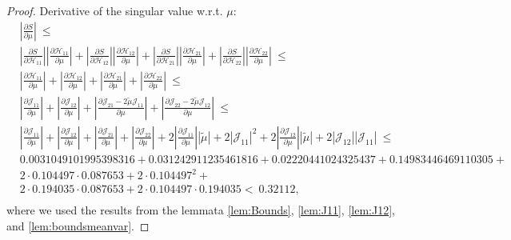 \documentclass{article}
\newcommand\munn{{\tilde \mu}}
\renewcommand{\leq}{\leqslant}
\begin{document}
\begin{proof}
Derivative of the singular value w.r.t. $\mu$:
\begin{align}
&\left|\frac{\partial S}{\partial \mu}\right| \ \leq \\\nonumber
&\left|\frac{\partial S}{\partial {\mathcal H}_{11}}\right| \left|\frac{\partial {\mathcal H}_{11}}{\partial \mu}\right| + 
\left| \frac{\partial S}{\partial {\mathcal H}_{12}}\right| \left|\frac{\partial {\mathcal H}_{12}}{\partial \mu}\right| + 
\left| \frac{\partial S}{\partial {\mathcal H}_{21}}\right| \left|\frac{\partial {\mathcal H}_{21}}{\partial \mu}\right| + 
\left| \frac{\partial S}{\partial {\mathcal H}_{22}}\right| \left|\frac{\partial {\mathcal H}_{22}}{\partial \mu}\right|
\ \leq \\\nonumber
&\left|\frac{\partial {\mathcal H}_{11}}{\partial \mu}\right| + 
\left|\frac{\partial {\mathcal H}_{12}}{\partial \mu} \right| + 
\left|\frac{\partial {\mathcal H}_{21}}{\partial \mu} \right|+ 
\left|\frac{\partial {\mathcal H}_{22}}{\partial \mu}\right|
\ \leq \\\nonumber
&\left|\frac{\partial {\mathcal J}_{11}}{\partial \mu}\right| + 
\left|\frac{\partial {\mathcal J}_{12}}{\partial \mu} \right| + 
\left|\frac{\partial {\mathcal J}_{21} - 2 \munn {\mathcal J}_{11}}{\partial \mu} \right|+ 
\left|\frac{\partial {\mathcal J}_{22} - 2 \munn {\mathcal J}_{12}}{\partial \mu}\right|
\ \leq \\\nonumber
&\left|\frac{\partial {\mathcal J}_{11}}{\partial \mu}\right| + 
\left|\frac{\partial {\mathcal J}_{12}}{\partial \mu} \right| + 
\left|\frac{\partial {\mathcal J}_{21}}{\partial \mu} \right|+ 
\left|\frac{\partial {\mathcal J}_{22}}{\partial \mu}\right| +
2 \left|\frac{\partial {\mathcal J}_{11}}{\partial \mu}\right| \left| \munn\right|  + 2 \left| \mathcal{J}_{11} \right|^2 +
2 \left|\frac{\partial {\mathcal J}_{12}}{\partial \mu}\right| \left| \munn\right|  + 2 \left| \mathcal{J}_{12} \right| \left| \mathcal{J}_{11} \right|
\ \leq \\\nonumber
& 0.0031049101995398316 + 0.031242911235461816  + 0.02220441024325437 + 0.14983446469110305 + \\ \nonumber
& 2 \cdot 0.104497 \cdot 0.087653 + 2\cdot 0.104497^2 + \\ \nonumber
& 2 \cdot 0.194035 \cdot 0.087653 + 2 \cdot  0.104497 \cdot 0.194035
< \ 0.32112,  \\\nonumber
\end{align}
where we used the results from the lemmata \ref{lem:Bounds}, \ref{lem:J11}, \ref{lem:J12}, and \ref{lem:boundsmeanvar}.


\end{proof}
\end{document}

